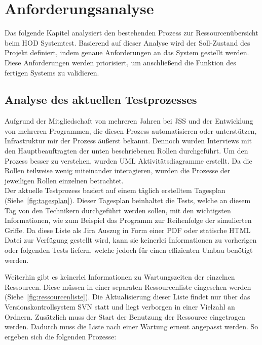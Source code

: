 \section{Anforderungsanalyse}
Das folgende Kapitel analysiert den bestehenden Prozess zur Ressourcenübersicht
beim \gls{HOD} Systemtest. Basierend auf dieser Analyse wird der Soll-Zustand 
des Projekt definiert, indem genaue Anforderungen an das System gestellt werden. 
Diese Anforderungen werden priorisiert, um anschließend die Funktion des 
fertigen Systems zu validieren.

\subsection{Analyse des aktuellen Testprozesses}
Aufgrund der Mitgliedschaft von mehreren Jahren bei \gls{JSS} und der Entwicklung
von mehreren Programmen, die diesen Prozess automatisieren oder unterstützen, Infrastruktur
mir der Prozess äußerst bekannt. Dennoch wurden Interviews mit den Hauptbeauftragten
der unten beschriebenen Rollen durchgeführt. Um den Prozess besser zu verstehen,
wurden UML Aktivitätsdiagramme erstellt. Da die Rollen teilweise wenig 
miteinander interagieren, wurden die Prozesse der jeweiligen Rollen einzelnen
betrachtet.\\

Der aktuelle Testprozess basiert auf einem täglich erstelltem Tagesplan 
(Siehe~\ref{fig:tagesplan}). Dieser Tagesplan beinhaltet die Tests, welche an diesem
Tag von den \gls{Techniker}n durchgeführt werden sollen, mit den wichtigsten 
Informationen, wie zum Beispiel das Programm zur Reihenfolge der simulierten Griffe.
Da diese Liste als Jira Auszug in Form einer \gls{PDF} oder statische \gls{HTML} Datei zur Verfügung 
gestellt wird, kann sie keinerlei Informationen zu vorherigen oder folgenden 
Tests liefern, welche jedoch für einen effizienten Umbau benötigt werden.

Weiterhin gibt es keinerlei Informationen zu Wartungszeiten der einzelnen Ressourcen.
Diese müssen in einer separaten Ressourcenliste eingesehen werden
(Siehe~\ref{fig:ressourcenliste}). Die Aktualisierung dieser Liste findet nur über 
das Versionskontrollsystem \gls{SVN} statt und liegt verborgen in einer Vielzahl
an Ordnern. Zusätzlich muss der Start der Benutzung der Ressource eingetragen
werden. Dadurch muss die Liste nach einer Wartung erneut angepasst werden. So 
ergeben sich die folgenden Prozesse:

